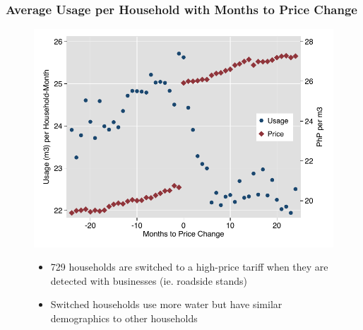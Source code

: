 \documentclass[aspectratio=32]{beamer}
\begin{document}
\begin{frame}
\frametitle{Average Usage per Household with Months to Price Change}

\begin{figure}
\begin{center}
\includegraphics[scale=.54]{tables/r_to_s_only_graph.pdf}
\end{center}
\begin{itemize}
\item 729 households are switched to a high-price tariff when they are detected with businesses (ie. roadside stands)
\item Switched households use more water but have similar demographics to other households
\end{itemize}
\end{figure}
\end{frame}


\end{document}
